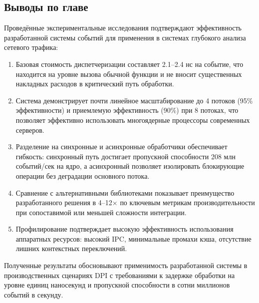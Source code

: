 \subsection{Выводы по главе}

Проведённые экспериментальные исследования подтверждают эффективность разработанной системы событий для применения в системах глубокого анализа сетевого трафика:

\begin{enumerate}
    \item Базовая стоимость диспетчеризации составляет 2.1--2.4 нс на событие, что находится на уровне вызова обычной функции и не вносит существенных накладных расходов в критический путь обработки.

    \item Система демонстрирует почти линейное масштабирование до 4 потоков (95\% эффективности) и приемлемую эффективность (90\%) при 8 потоках, что позволяет эффективно использовать многоядерные процессоры современных серверов.

    \item Разделение на синхронные и асинхронные обработчики обеспечивает гибкость: синхронный путь достигает пропускной способности 208 млн событий/сек на ядро, а асинхронный позволяет изолировать блокирующие операции без деградации основного потока.

    \item Сравнение с альтернативными библиотеками показывает преимущество разработанного решения в 4--12$\times$ по ключевым метрикам производительности при сопоставимой или меньшей сложности интеграции.

    \item Профилирование подтверждает высокую эффективность использования аппаратных ресурсов: высокий IPC, минимальные промахи кэша, отсутствие лишних контекстных переключений.
\end{enumerate}

Полученные результаты обосновывают применимость разработанной системы в производственных сценариях DPI с требованиями к задержке обработки на уровне единиц наносекунд и пропускной способности в сотни миллионов событий в секунду.
\newpage